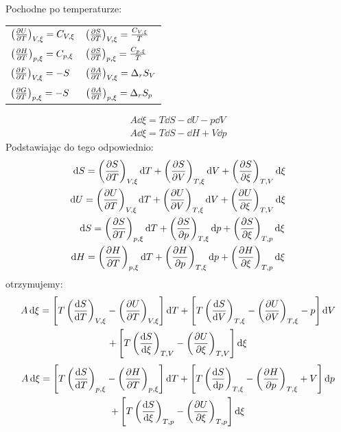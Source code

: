 \documentclass[10pt, a4paper, twoside, onecolumn]{article}
\numberwithin{equation}{section}
\begin{document}
	Pochodne po temperaturze:
	\begin{table}[H]
	\centering
	\begin{tabular}{ll}
		\(\left(\pdv{U}{T}\right)_{V, \xi}=C_{V, \xi}\) & \(\left(\pdv{S}{T}\right)_{V, \xi}=\frac{C_{V, \xi}}{T}\) \\
		\(\left(\pdv{H}{T}\right)_{p, \xi}=C_{p, \xi}\) & \(\left(\pdv{S}{T}\right)_{p, \xi}=\frac{C_{p, \xi}}{T}\) \\
		\(\left(\pdv{F}{T}\right)_{V, \xi}=-S\) & \(\left(\pdv{A}{T}\right)_{V, \xi}=\Delta_{r}S_{V}\) \\
		\(\left(\pdv{G}{T}\right)_{p, \xi}=-S\) & \(\left(\pdv{A}{T}\right)_{p, \xi}=\Delta_{r}S_{p}\)
	\end{tabular}
	\end{table}
	\begin{gather}
		A\dd{\xi}=T\dd{S}-\dd{U}-p\dd{V} \\
		A\dd{\xi}=T\dd{S}-\dd{H}+V\dd{p}
	\end{gather}
	Podstawiając do tego odpowiednio: 
	\begin{gather}
	\begin{split}
		\dd{S}=\left(\pdv{S}{T}\right)_{V, \xi}\dd{T}+\left(\pdv{S}{V}\right)_{T, \xi}\dd{V}+\left(\pdv{S}{\xi}\right)_{T, V}\dd{\xi} \\
		\dd{U}=\left(\pdv{U}{T}\right)_{V, \xi}\dd{T}+\left(\pdv{U}{V}\right)_{T, \xi}\dd{V}+\left(\pdv{U}{\xi}\right)_{T, V}\dd{\xi}
	\end{split} \\
	\begin{split}
		\dd{S}=\left(\pdv{S}{T}\right)_{p, \xi}\dd{T}+\left(\pdv{S}{p}\right)_{T, \xi}\dd{p}+\left(\pdv{S}{\xi}\right)_{T, p}\dd{\xi} \\
		\dd{H}=\left(\pdv{H}{T}\right)_{p, \xi}\dd{T}+\left(\pdv{H}{p}\right)_{T, \xi}\dd{p}+\left(\pdv{H}{\xi}\right)_{T, p}\dd{\xi}
	\end{split}
	\end{gather}
	otrzymujemy:
	\begin{multline}
		A\dd{\xi}=\left[T\left(\dv{S}{T}\right)_{V, \xi}-\left(\pdv{U}{T}\right)_{V, \xi}\right]\dd{T}+\left[T\left(\dv{S}{V}\right)_{T, \xi}-\left(\pdv{U}{V}\right)_{T, \xi}-p\right]\dd{V} \\
		+\left[T\left(\dv{S}{\xi}\right)_{T, V}-\left(\pdv{U}{\xi}\right)_{T, V}\right]\dd{\xi}
	\end{multline}
	\begin{multline}
		A\dd{\xi}=\left[T\left(\dv{S}{T}\right)_{p, \xi}-\left(\pdv{H}{T}\right)_{p, \xi}\right]\dd{T}+\left[T\left(\dv{S}{p}\right)_{T, \xi}-\left(\pdv{H}{p}\right)_{T, \xi}+V\right]\dd{p} \\
		+\left[T\left(\dv{S}{\xi}\right)_{T, p}-\left(\pdv{U}{\xi}\right)_{T, p}\right]\dd{\xi}
	\end{multline}
\end{document}
